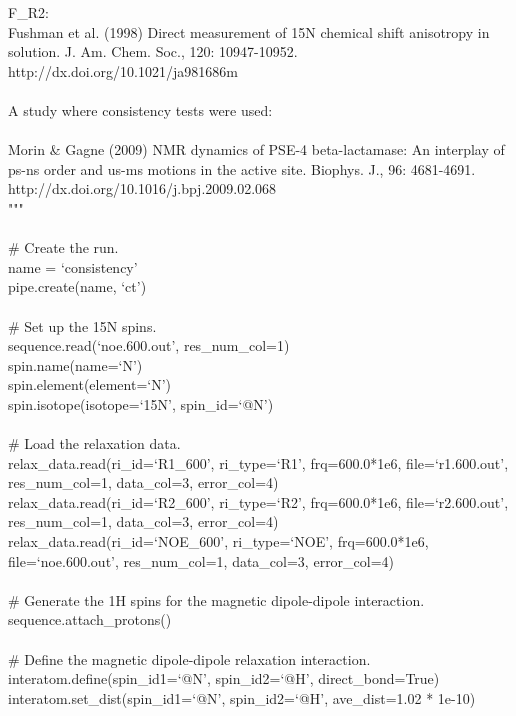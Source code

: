 \begin{exampleenv}
    F\_R2: \\
        Fushman et al. (1998) Direct measurement of 15N chemical shift anisotropy in solution. J. Am. Chem. Soc., 120: 10947-10952. http://dx.doi.org/10.1021/ja981686m \\
 \\
A study where consistency tests were used: \\
 \\
    Morin \& Gagne (2009) NMR dynamics of PSE-4 beta-lactamase: An interplay of ps-ns order and us-ms motions in the active site. Biophys. J., 96: 4681-4691. http://dx.doi.org/10.1016/j.bpj.2009.02.068  \\
""" \\
 \\
\# Create the run. \\
name = `consistency' \\
pipe.create(name, `ct') \\
 \\
\# Set up the 15N spins. \\
sequence.read(`noe.600.out', res\_num\_col=1) \\
spin.name(name=`N') \\
spin.element(element=`N') \\
spin.isotope(isotope=`15N', spin\_id=`@N') \\
 \\
\# Load the relaxation data. \\
relax\_data.read(ri\_id=`R1\_600',  ri\_type=`R1',  frq=600.0*1e6, file=`r1.600.out',  res\_num\_col=1, data\_col=3, error\_col=4) \\
relax\_data.read(ri\_id=`R2\_600',  ri\_type=`R2',  frq=600.0*1e6, file=`r2.600.out',  res\_num\_col=1, data\_col=3, error\_col=4) \\
relax\_data.read(ri\_id=`NOE\_600', ri\_type=`NOE', frq=600.0*1e6, file=`noe.600.out', res\_num\_col=1, data\_col=3, error\_col=4) \\
 \\
\# Generate the 1H spins for the magnetic dipole-dipole interaction. \\
sequence.attach\_protons() \\
 \\
\# Define the magnetic dipole-dipole relaxation interaction. \\
interatom.define(spin\_id1=`@N', spin\_id2=`@H', direct\_bond=True) \\
interatom.set\_dist(spin\_id1=`@N', spin\_id2=`@H', ave\_dist=1.02 * 1e-10) \\

\end{exampleenv}
